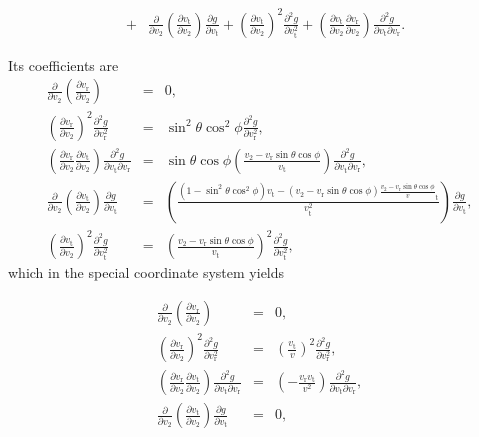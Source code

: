 \documentclass[11pt]{article}
\newcommand{\rt}{\mathrm{t}}
\newcommand{\rr}{\mathrm{r}}
\newcommand{\vr}{v_{\rr}}
\newcommand{\vt}{v_{\rt}}
\begin{document}
\begin{appendices}
\begin{equation}
\begin{array}{ccl}
  {} &+& \displaystyle{\frac{\partial}{\partial v_{2}}\left(\frac{\partial \vt}{\partial v_{2}}\right)\frac{\partial g}{\partial \vt}+\left(\frac{\partial \vt}{\partial v_{2}}\right)^{2}\frac{\partial^{2}g}{\partial \vt^{2}}+\left(\frac{\partial \vt}{\partial v_{2}}\frac{\partial \vr}{\partial v_{2}}\right)\frac{\partial^{2}g}{\partial \vt\partial \vr}} .
\end{array}
\label{eq:d2gdv22_Arbitrary}
\end{equation}

Its coefficients are
\begin{equation}
\begin{array}{ccl}
  \displaystyle{\frac{\partial}{\partial v_{2}}\left(\frac{\partial \vr}{\partial v_{2}}\right)}&=& \displaystyle{0} ,\\
  \displaystyle{\left(\frac{\partial \vr}{\partial v_{2}}\right)^{2}\frac{\partial^{2}g}{\partial \vr^{2}}}&=& \displaystyle{\sin^{2}\theta\cos^{2}\phi\frac{\partial^{2}g}{\partial \vr^{2}}} ,\\
  \displaystyle{\left(\frac{\partial \vr}{\partial v_{2}}\frac{\partial \vt}{\partial v_{2}}\right)\frac{\partial^{2}g}{\partial \vt\partial \vr}}&=& \displaystyle{\sin\theta\cos\phi\left(\frac{v_{2}-\vr\sin\theta\cos\phi}{\vt}\right)\frac{\partial^{2}g}{\partial \vt\partial \vr}} ,\\
  \displaystyle{\frac{\partial}{\partial v_{2}}\left(\frac{\partial \vt}{\partial v_{2}}\right)\frac{\partial g}{\partial \vt}}&=& \displaystyle{\left(\frac{(1-\sin^{2}\theta\cos^{2}\phi)\vt-(v_{2}-\vr\sin\theta\cos\phi)\frac{v_{2}-\vr\sin\theta\cos\phi}\vt}{\vt^{2}}\right)\frac{\partial g}{\partial \vt}} ,\\
 
  \displaystyle{\left(\frac{\partial \vt}{\partial v_{2}}\right)^{2}\frac{\partial^{2}g}{\partial \vt^{2}}}&=& \displaystyle{\left(\frac{v_{2}-\vr\sin\theta\cos\phi}{\vt}\right)^{2}\frac{\partial^{2}g}{\partial \vt^{2}}} ,
\end{array}
\label{eq:d2gdv22_Coeffs_Arbitrary}
\end{equation}
which in the special coordinate system yields

\begin{equation}
\begin{array}{ccl}
  \displaystyle{\frac{\partial}{\partial v_{2}}\left(\frac{\partial \vr}{\partial v_{2}}\right)}&=& \displaystyle{0} ,\\
  \displaystyle{\left(\frac{\partial \vr}{\partial v_{2}}\right)^{2}\frac{\partial^{2}g}{\partial \vr^{2}}}&=& \displaystyle{\left(\frac{\vt}{v}\right)^{2}\frac{\partial^{2}g}{\partial \vr^{2}}} ,\\
  \displaystyle{\left(\frac{\partial \vr}{\partial v_{2}}\frac{\partial \vt}{\partial v_{2}}\right)\frac{\partial^{2}g}{\partial \vt\partial \vr}}&=& \displaystyle{\left(-\frac{\vr \vt}{v^{2}}\right)\frac{\partial^{2}g}{\partial \vt\partial \vr}} ,\\
  \displaystyle{\frac{\partial}{\partial v_{2}}\left(\frac{\partial \vt}{\partial v_{2}}\right)\frac{\partial g}{\partial \vt}}&=& \displaystyle{0} ,\\
 

\end{array}
\end{equation}
\end{appendices}
\end{document}
